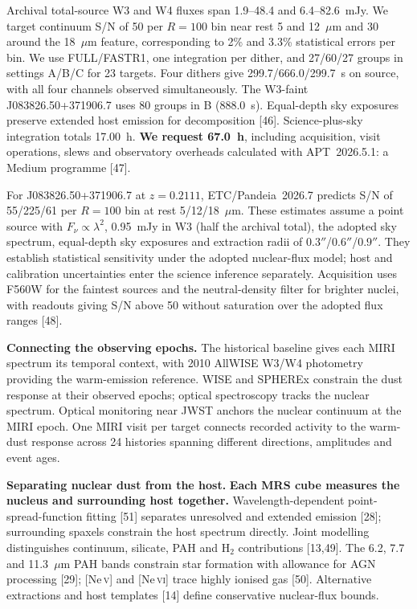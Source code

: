 \documentclass[12pt]{article}
\begin{document}
Archival total-source W3 and W4 fluxes span 1.9--48.4 and 6.4--82.6~mJy. We target continuum S/N of 50 per $R=100$ bin near rest 5 and 12~$\mu$m and 30 around the 18~$\mu$m feature, corresponding to 2\% and 3.3\% statistical errors per bin. We use FULL/FASTR1, one integration per dither, and 27/60/27 groups in settings A/B/C for 23 targets. Four dithers give 299.7/666.0/299.7~s on source, with all four channels observed simultaneously. The W3-faint J083826.50+371906.7 uses 80 groups in B (888.0~s). Equal-depth sky exposures preserve extended host emission for decomposition [46]. Science-plus-sky integration totals 17.00~h. \textbf{We request 67.0~h}, including acquisition, visit operations, slews and observatory overheads calculated with APT~2026.5.1: a Medium programme [47].

For J083826.50+371906.7 at $z=0.2111$, ETC/Pandeia~2026.7 predicts S/N of 55/225/61 per $R=100$ bin at rest 5/12/18~$\mu$m. These estimates assume a point source with $F_\nu\propto\lambda^2$, 0.95~mJy in W3 (half the archival total), the adopted sky spectrum, equal-depth sky exposures and extraction radii of $0.3''$/$0.6''$/$0.9''$. They establish statistical sensitivity under the adopted nuclear-flux model; host and calibration uncertainties enter the science inference separately. Acquisition uses F560W for the faintest sources and the neutral-density filter for brighter nuclei, with readouts giving S/N above 50 without saturation over the adopted flux ranges [48].

\noindent\textbf{Connecting the observing epochs.}
The historical baseline gives each MIRI spectrum its temporal context, with 2010 AllWISE W3/W4 photometry providing the warm-emission reference. WISE and SPHEREx constrain the dust response at their observed epochs; optical spectroscopy tracks the nuclear spectrum. Optical monitoring near JWST anchors the nuclear continuum at the MIRI epoch. One MIRI visit per target connects recorded activity to the warm-dust response across 24 histories spanning different directions, amplitudes and event ages.

\noindent\textbf{Separating nuclear dust from the host.}
\textbf{Each MRS cube measures the nucleus and surrounding host together.} Wavelength-dependent point-spread-function fitting [51] separates unresolved and extended emission [28]; surrounding spaxels constrain the host spectrum directly. Joint modelling distinguishes continuum, silicate, PAH and H$_2$ contributions [13,49]. The 6.2, 7.7 and 11.3~$\mu$m PAH bands constrain star formation with allowance for AGN processing [29]; [Ne\,\textsc{v}] and [Ne\,\textsc{vi}] trace highly ionised gas [50]. Alternative extractions and host templates [14] define conservative nuclear-flux bounds.
\end{document}
